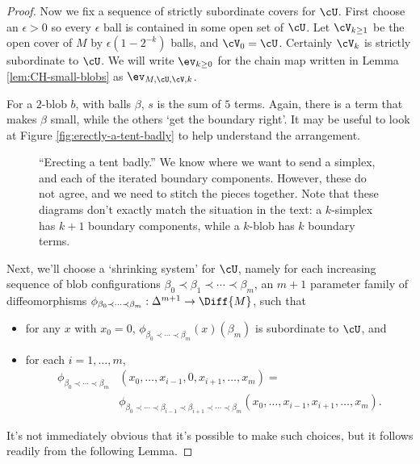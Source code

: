 \begin{proof}
Now we fix a sequence of strictly subordinate covers for $\cU$. First choose an $\epsilon > 0$ so every $\epsilon$ ball is contained in some open set of $\cU$. Let $\cV_{k \geq 1}$ be the open cover of $M$ by $\epsilon (1-2^{-k})$ balls, and $\cV_0 = \cU$. Certainly $\cV_k$ is strictly subordinate to $\cU$. We will write $\ev_{k \geq 0}$ for the chain map written in Lemma \ref{lem:CH-small-blobs} as $\ev_{M,\cU,\cV,k}$.

For a $2$-blob $b$, with balls $\beta$, $s$ is the sum of $5$ terms. Again, there is a term that makes $\beta$ small, while the others `get the boundary right'. It may be useful to look at Figure \ref{fig:erectly-a-tent-badly} to help understand the arrangement.
\begin{figure}[!ht]
\todo{}
\caption{``Erecting a tent badly.'' We know where we want to send a simplex, and each of the iterated boundary components. However, these do not agree, and we need to stitch the pieces together. Note that these diagrams don't exactly match the situation in the text: a $k$-simplex has $k+1$ boundary components, while a $k$-blob has $k$ boundary terms.}
\end{figure}

Next, we'll choose a `shrinking system' for $\cU$, namely for each increasing sequence of blob configurations
$\beta_0 \prec \beta_1 \prec \cdots \prec \beta_m$, an $m+1$ parameter family of diffeomorphisms
$\phi_{\beta_0 \prec \cdots \prec \beta_m} : \Delta^{m+1} \to \Diff{M}$, such that
\begin{itemize}
\item for any $x$ with $x_0 = 0$, $\phi_{\beta_0 \prec \cdots \prec \beta_m}(x)(\beta_m)$ is subordinate to $\cU$, and
\item for each $i = 1, \ldots, m$,
\begin{align*}
\phi_{\beta_0 \prec \cdots \prec \beta_m}&(x_0, \ldots, x_{i-1},0,x_{i+1},\ldots,x_m) = \\ &\phi_{\beta_0 \prec \cdots \prec \beta_{i-1} \prec \beta_{i+1} \prec \cdots \prec \beta_m}(x_0,\ldots, x_{i-1},x_{i+1},\ldots,x_m).
\end{align*}
\end{itemize}
It's not immediately obvious that it's possible to make such choices, but it follows readily from the following Lemma.



\end{proof}
